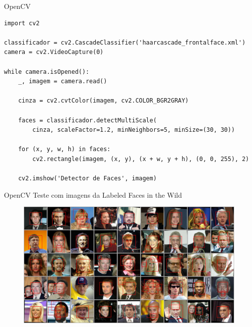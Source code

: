 \begin{frame}[fragile]{OpenCV}
\begin{verbatim}
import cv2

classificador = cv2.CascadeClassifier('haarcascade_frontalface.xml')
camera = cv2.VideoCapture(0)

while camera.isOpened():
    _, imagem = camera.read()

    cinza = cv2.cvtColor(imagem, cv2.COLOR_BGR2GRAY)

    faces = classificador.detectMultiScale(
        cinza, scaleFactor=1.2, minNeighbors=5, minSize=(30, 30))

    for (x, y, w, h) in faces:
        cv2.rectangle(imagem, (x, y), (x + w, y + h), (0, 0, 255), 2)

    cv2.imshow('Detector de Faces', imagem)
\end{verbatim}
\end{frame}


\begin{frame}{OpenCV}
Teste com imagens da Labeled Faces in the Wild
\begin{figure}[htbp]
    \label{fig:detector_facial_lfw}
    \begin{center}
        {\includegraphics[width=0.99\linewidth]{imagens/detector_facial_lfw.jpg}}
    \end{center}
\end{figure}
\end{frame}